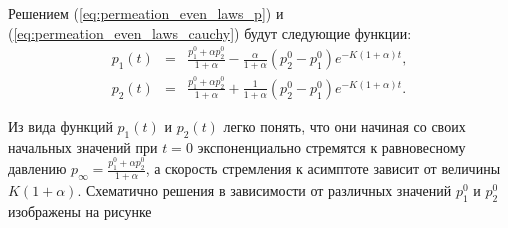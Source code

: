 Решением (\ref{eq:permeation_even_laws_p}) и (\ref{eq:permeation_even_laws_cauchy}) будут следующие функции:
\begin{eqnarray}
\label{permeation_even_p1}
p_1(t) & = & \frac{p_1^0 + \alpha p_2^0}{1+\alpha} - \frac{\alpha}{1+\alpha}(p_2^0-p_1^0)e^{-K(1+\alpha)t}, \\
\label{permeation_even_p2}
p_2(t) & = & \frac{p_1^0 + \alpha p_2^0}{1+\alpha} + \frac{1}{1+\alpha}(p_2^0-p_1^0)e^{-K(1+\alpha)t}.
\end{eqnarray}

Из вида функций $p_1(t)$ и $p_2(t)$ легко понять, что они начиная со своих начальных значений при $t=0$ экспоненциально стремятся к равновесному давлению $p_\infty=\displaystyle\frac{p_1^0 + \alpha p_2^0}{1+\alpha}$, а скорость стремления к асимптоте зависит от величины $K(1+\alpha)$. Схематично решения в зависимости от различных значений $p_1^0$ и $p_2^0$ изображены на рисунке %

%

